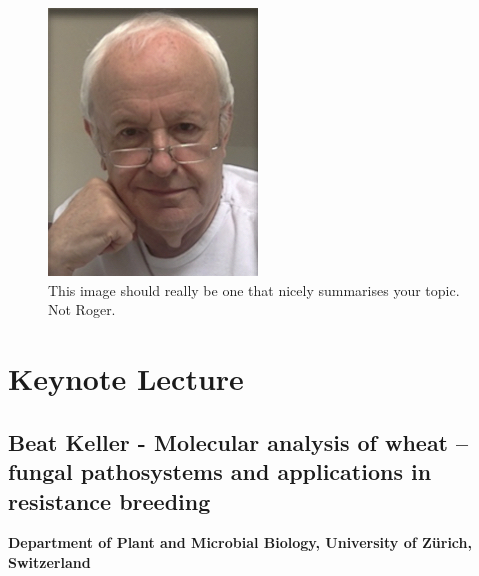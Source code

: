 \documentclass[12pt,]{book}
\theoremstyle{definition}
\theoremstyle{definition}
\theoremstyle{remark}
\begin{document}
\begin{figure}
\includegraphics[width=2.19in]{assets/RPF-thumbnail} \caption{This image should really be one that nicely summarises your topic. Not Roger.}\label{fig:maint}
\end{figure}

\section*{Keynote Lecture}\label{keynote-lecture-7}

\subsection*{Beat Keller - Molecular analysis of wheat -- fungal
pathosystems and applications in resistance
breeding}\label{beat-keller---molecular-analysis-of-wheat-fungal-pathosystems-and-applications-in-resistance-breeding}

\textbf{Department of Plant and Microbial Biology, University of Zürich,
Switzerland}
\end{document}

